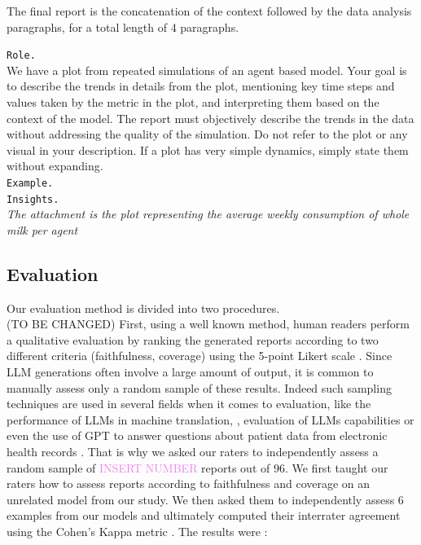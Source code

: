 \documentclass[preprint,12pt]{elsarticle}
\begin{document}
The final report is the concatenation of the context followed by the data analysis paragraphs, for a total length of 4 paragraphs.\\

\vspace*{-2cm}
\begin{tcolorbox}[colback=white!95!gray, colframe=black, title=Prompt 2 : \texttt{text} is a feature from the design of experiment. \textit{text} is a part of the prompt changing according to the model and the experiment. Complete prompts can be found in the supplementary material file.,  label=box:prompt2]
\texttt{Role.}\\

We have a plot from repeated simulations of an agent based model. Your goal is to describe the trends in details from the plot, mentioning key time steps and values taken by the metric in the plot, and interpreting them based on the context of the model. The report must objectively describe the trends in the data without addressing the quality of the simulation. Do not refer to the plot or any visual in your description. If a plot has very simple dynamics, simply state them without expanding.\\

\texttt{Example.}\\

\texttt{Insights.}\\

\textit{The attachment is the plot representing the average weekly consumption of whole milk per agent}
\end{tcolorbox}




\subsection{Evaluation}
\label{subsec4}


Our evaluation method is divided into two procedures. \\

(TO BE CHANGED) First, using a well known method, human readers perform a qualitative evaluation by ranking the generated reports according to two different criteria (faithfulness, coverage) using the 5-point Likert scale \cite{Fischer2022} \cite{Li2022} \cite{Gatt2018}. Since LLM generations often involve a large amount of output, it is common to manually assess only a random sample of these results. Indeed such sampling techniques are used in several fields when it comes to evaluation, like the performance of LLMs in machine translation, \cite{Hendy2023}, evaluation of LLMs capabilities \cite{openai2024} or even the use of GPT to answer questions about patient data from electronic health records \cite{Vatsal2024}. That is why we asked our raters to independently assess a random sample of \textcolor{violet}{INSERT NUMBER} reports out of $96$. We first taught our raters how to assess reports according to faithfulness and coverage on an unrelated model from our study. We then asked them to independently assess 6 examples from our models and ultimately computed their interrater agreement using the Cohen's Kappa metric \cite{Brake2024}. The results were : \\
\end{document}
